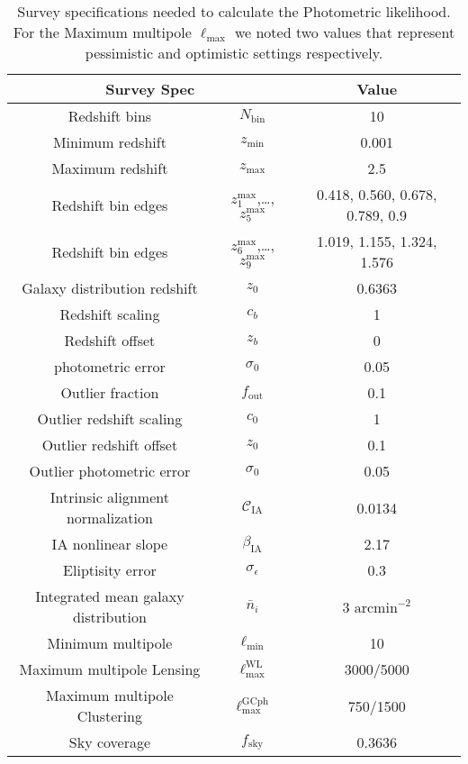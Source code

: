 \documentclass[oneside]{book}
\begin{document}
\begin{table}
    \centering
    \begin{tabular}{cc|c}
    \multicolumn{2}{c|}{Survey Spec }& Value \\
    \hline
    Redshift bins & $N_\mathrm{bin}$ & 10\\
    Minimum redshift& $z_\mathrm{min}$ & 0.001\\
    Maximum redshift& $z_\mathrm{max}$ & 2.5\\
    Redshift bin edges& $z_1^\mathrm{max}$,…, $z_5^\mathrm{max}$ & 0.418, 0.560, 0.678, 0.789, 0.9\\
    Redshift bin edges& $z_6^\mathrm{max}$,…, $z_9^\mathrm{max}$ & 1.019, 1.155, 1.324, 1.576\\
    Galaxy distribution redshift& $z_0$ & 0.6363\\
    Redshift scaling & $c_b$ & 1\\
    Redshift offset &$z_b$& 0\\
    photometric error & $\sigma_0$ & 0.05\\
    Outlier fraction &$f_\mathrm{out}$& 0.1\\
    Outlier redshift scaling& $c_0$ & 1\\
    Outlier redshift offset & $z_0$ & 0.1\\
    Outlier photometric error &$\sigma_0$& 0.05\\
    Intrinsic alignment normalization& $\mathcal{C}_\mathrm{IA}$ & 0.0134\\
    IA nonlinear slope& $\beta_\mathrm{IA}$ & 2.17\\
    Eliptisity error& $\sigma_\epsilon$& 0.3\\
    Integrated mean galaxy distribution& $\bar{n}_i$ &3 $\mathrm{arcmin}^{-2}$\\
    Minimum multipole& $\ell_\mathrm{min}$& 10\\
    Maximum multipole Lensing& $\ell_\mathrm{max}^\mathrm{WL}$ &3000/5000\\
    Maximum multipole Clustering&$\ell_\mathrm{max}^\mathrm{GCph}$ &750/1500\\
    Sky coverage &$f_\mathrm{sky}$ & 0.3636
    \end{tabular}
    \caption{Survey specifications needed to calculate the Photometric likelihood. For the Maximum multipole $\ell_\mathrm{max}$ we noted two values that represent pessimistic and optimistic settings respectively.}
    \label{tab:survey_spec_photo}
\end{table}
\end{document}
